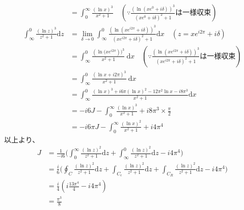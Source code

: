 \documentclass[dvipdfmx,a4paper]{jsarticle}
\begin{document}
\begin{align*}
 &= \int_{0}^{\infty}  \frac{(\ln{x})^3}{x^2 + 1}\quad(\because \frac{(\ln{(xe^0 + i\delta)})^3}{(xe^0 + i\delta)^2 + 1}は一様収束)\\
 \int_{\infty}^{0} \frac{(\ln{z})^3}{z^2 + 1} \mathrm{d}z &= \lim_{\delta \to 0}\int_{\infty}^{0} \frac{(\ln{(xe^{i2\pi} + i\delta)})^3}{(xe^{i2\pi} + i\delta)^2 + 1}\mathrm{d}x \quad(z = xe^{i2\pi} + i\delta)\\
 &= \int_{\infty}^{0} \frac{(\ln{(xe^{i2\pi}}))^3}{x^2 + 1}\ \mathrm{d}x\quad(\because\frac{(\ln{(xe^{i2\pi} + i\delta)})^3}{(xe^{i2\pi} + i\delta)^2 + 1} は一様収束)\\
 &= \int_{\infty}^{0} \frac{(\ln{x} + i2\pi)^3}{x^2 + 1}\ \mathrm{d}x\\
 &= \int_{\infty}^{0} \frac{(\ln{x})^3 + i6\pi(\ln{x})^2 -12\pi^2\ln{x} - i8\pi^3}{x^2 + 1}\mathrm{d}x\\
 &= -i6J - \int_{0}^{\infty} \frac{(\ln{x})^3}{x^2 + 1} + i8\pi^3 \times \frac{\pi}{2}\\
 &= -i6\pi J - \int_{0}^{\infty} \frac{(\ln{x})^2}{x^2 + 1} +i4\pi^4
 \end{align*}
 以上より、
 \begin{align*}
 J &= \frac{1}{-i6}\biggl(\int_{0}^{\infty} \frac{(\ln{z})^2}{z^2 + 1} \mathrm{d}z + \int_{\infty}^{0} \frac{(\ln{z})^2}{z^2 + 1} \mathrm{d}z - i4\pi^4\biggr)\\
 &=\frac{i}{6}\biggl(\oint_C\frac{(\ln{z})^2}{z^2 + 1}\mathrm{d}z + \int_{C_\epsilon}\frac{(\ln{z})^2}{z^2 + 1}\mathrm{d}z +  \int_{C_R}\frac{(\ln{z})^2}{z^2 + 1}\mathrm{d}z - i4\pi^4\biggr)\\
&=\frac{i}{4}(i\frac{13\pi^4}{4} -  i4\pi^4)\\
&= \frac{\pi^3}{8}
 \end{align*}
\\

 
\end{document}
